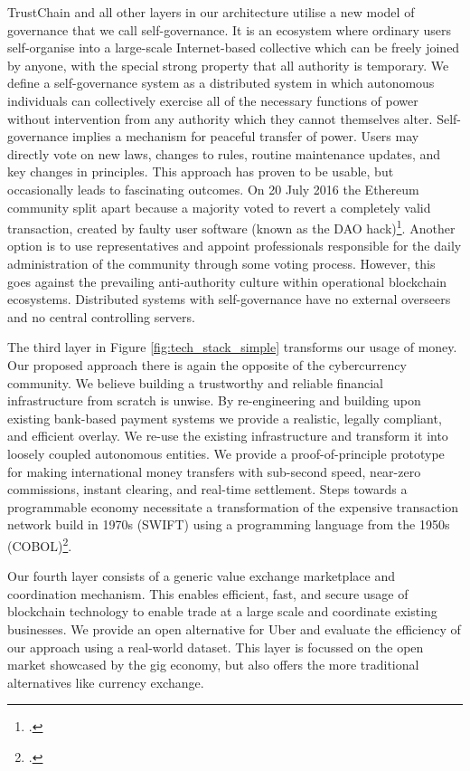 \documentclass[USenglish]{article}
\begin{document}
TrustChain and all other layers in our architecture utilise a new model of governance that we call self-governance.
It is an ecosystem where ordinary users self-organise into a large-scale Internet-based collective which can be freely joined by anyone, with the special strong property that all authority is temporary.
We define a self-governance system as a distributed system in which autonomous individuals can collectively exercise all of the necessary functions of power without intervention from any authority which they cannot themselves alter.
Self-governance implies a mechanism for peaceful transfer of power. 
Users may directly vote on new laws, changes to rules, routine maintenance updates, and key changes in principles. 
This approach has proven to be usable, but occasionally leads to fascinating outcomes.
On 20 July 2016 the Ethereum community split apart because a majority voted to revert a completely valid transaction, created by faulty user software (known as the DAO hack)\footcite{cryptocomparedao}.
Another option is to use representatives and appoint professionals responsible for the daily administration of the community through some voting process.
However, this goes against the prevailing anti-authority culture within operational blockchain ecosystems.
Distributed systems with self-governance have no external overseers and no central controlling servers.

The third layer in Figure \ref{fig:tech_stack_simple} transforms our usage of money.
Our proposed approach there is again the opposite of the cybercurrency community.
We believe building a trustworthy and reliable financial infrastructure from scratch is unwise.
By re-engineering and building upon existing bank-based payment systems we provide a realistic, legally compliant, and efficient overlay.
We re-use the existing infrastructure and transform it into loosely coupled autonomous entities.
We provide a proof-of-principle prototype for making international money transfers with sub-second speed, near-zero commissions, instant clearing, and real-time settlement. 
Steps towards a programmable economy necessitate a transformation of the expensive transaction network build in 1970s (SWIFT) using a programming language from the 1950s (COBOL)\footcite{scott2017society}.

Our fourth layer consists of a generic value exchange marketplace and coordination mechanism.
This enables efficient, fast, and secure usage of blockchain technology to enable trade at a large scale and coordinate existing businesses.
We provide an open alternative for Uber and evaluate the efficiency of our approach using a real-world dataset.
This layer is focussed on the open market showcased by the gig economy, but also offers the more traditional alternatives like currency exchange.
\end{document}
